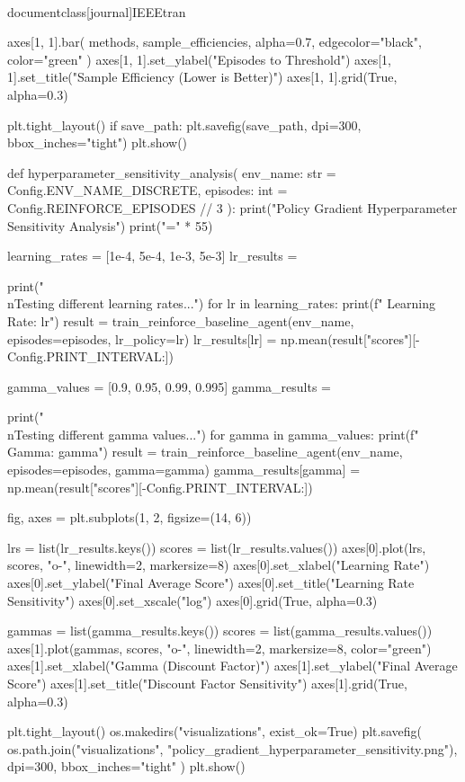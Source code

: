 \\documentclass[journal]{IEEEtran}
\begin{document}
    axes[1, 1].bar(
        methods, sample_efficiencies, alpha=0.7, edgecolor="black", color="green"
    )
    axes[1, 1].set_ylabel("Episodes to Threshold")
    axes[1, 1].set_title("Sample Efficiency (Lower is Better)")
    axes[1, 1].grid(True, alpha=0.3)

    plt.tight_layout()
    if save_path:
        plt.savefig(save_path, dpi=300, bbox_inches="tight")
    plt.show()


def hyperparameter_sensitivity_analysis(
    env_name: str = Config.ENV_NAME_DISCRETE, episodes: int = Config.REINFORCE_EPISODES // 3
):
    print("Policy Gradient Hyperparameter Sensitivity Analysis")
    print("=" * 55)

    learning_rates = [1e-4, 5e-4, 1e-3, 5e-3]
    lr_results = {}

    print("\\nTesting different learning rates...")
    for lr in learning_rates:
        print(f"  Learning Rate: {lr}")
        result = train_reinforce_baseline_agent(env_name, episodes=episodes, lr_policy=lr)
        lr_results[lr] = np.mean(result["scores"][-Config.PRINT_INTERVAL:])

    gamma_values = [0.9, 0.95, 0.99, 0.995]
    gamma_results = {}

    print("\\nTesting different gamma values...")
    for gamma in gamma_values:
        print(f"  Gamma: {gamma}")
        result = train_reinforce_baseline_agent(env_name, episodes=episodes, gamma=gamma)
        gamma_results[gamma] = np.mean(result["scores"][-Config.PRINT_INTERVAL:])

    fig, axes = plt.subplots(1, 2, figsize=(14, 6))

    lrs = list(lr_results.keys())
    scores = list(lr_results.values())
    axes[0].plot(lrs, scores, "o-", linewidth=2, markersize=8)
    axes[0].set_xlabel("Learning Rate")
    axes[0].set_ylabel("Final Average Score")
    axes[0].set_title("Learning Rate Sensitivity")
    axes[0].set_xscale("log")
    axes[0].grid(True, alpha=0.3)

    gammas = list(gamma_results.keys())
    scores = list(gamma_results.values())
    axes[1].plot(gammas, scores, "o-", linewidth=2, markersize=8, color="green")
    axes[1].set_xlabel("Gamma (Discount Factor)")
    axes[1].set_ylabel("Final Average Score")
    axes[1].set_title("Discount Factor Sensitivity")
    axes[1].grid(True, alpha=0.3)

    plt.tight_layout()
    os.makedirs("visualizations", exist_ok=True)
    plt.savefig(
        os.path.join("visualizations", "policy_gradient_hyperparameter_sensitivity.png"), dpi=300, bbox_inches="tight"
    )
    plt.show()
\end{document}
